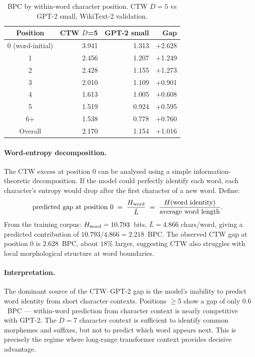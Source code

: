 \documentclass[11pt,a4paper]{article}
\begin{document}
\begin{table}[H]
\centering
\caption{BPC by within-word character position.
CTW $D=5$ vs GPT-2 small, WikiText-2 validation.}
\label{tab:pos}
{\small
\begin{tabular}{crrr}
\toprule
\textbf{Position} & \textbf{CTW $D$=5} & \textbf{GPT-2 small} & \textbf{Gap} \\
\midrule
0 (word-initial)  & 3.941 & 1.313 & $+$2.628 \\
1                 & 2.456 & 1.207 & $+$1.249 \\
2                 & 2.428 & 1.155 & $+$1.273 \\
3                 & 2.010 & 1.109 & $+$0.901 \\
4                 & 1.613 & 1.005 & $+$0.608 \\
5                 & 1.519 & 0.924 & $+$0.595 \\
6+                & 1.538 & 0.778 & $+$0.760 \\
\midrule
Overall           & 2.170 & 1.154 & $+$1.016 \\
\bottomrule
\end{tabular}}
\end{table}

\paragraph{Word-entropy decomposition.}
The CTW excess at position 0 can be analysed using a simple
information-theoretic decomposition.
If the model could perfectly identify each word, each character's
entropy would drop after the first character of a new word.
Define:
\begin{equation}
  \text{predicted gap at position 0}
  \;=\; \frac{H_{\rm word}}{\bar{L}}
  \;=\; \frac{H(\text{word identity})}{\text{average word length}}.
  \label{eq:word_entropy}
\end{equation}
From the training corpus: $H_{\rm word} = 10.793$~bits,
$\bar{L} = 4.866$ chars/word, giving a predicted contribution of
$10.793/4.866 = 2.218$~BPC.
The observed CTW gap at position 0 is $2.628$~BPC, about $18\%$ larger,
suggesting CTW also struggles with local morphological structure
at word boundaries.

\paragraph{Interpretation.}
The dominant source of the CTW--GPT-2 gap is the model's inability
to predict word identity from short character contexts.
Positions $\ge 5$ show a gap of only $0.6$~BPC — within-word prediction
from character context is nearly competitive with GPT-2.
The $D=7$ character context is sufficient to identify common morphemes
and suffixes, but not to predict which word appears next.
This is precisely the regime where long-range transformer context
provides decisive advantage.
\end{document}
